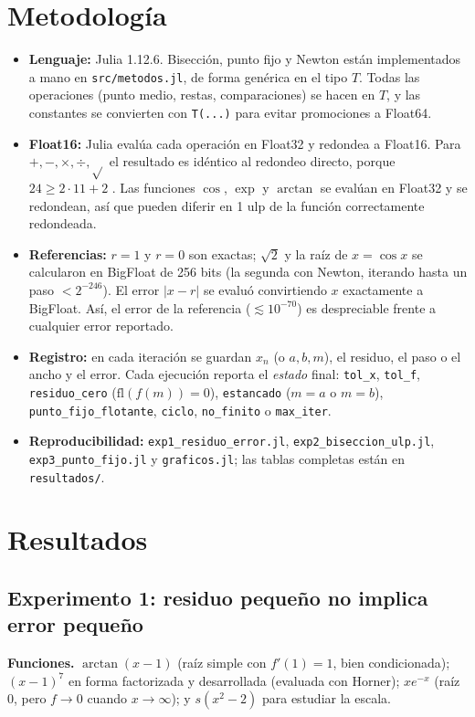\documentclass[11pt]{article}
\begin{document}
\section{Metodología}
\begin{itemize}
\item \textbf{Lenguaje:} Julia 1.12.6. Bisección, punto fijo y Newton están implementados a mano en \texttt{src/metodos.jl}, de forma genérica en el tipo $T$. Todas las operaciones (punto medio, restas, comparaciones) se hacen en $T$, y las constantes se convierten con \texttt{T(...)} para evitar promociones a Float64.
\item \textbf{Float16:} Julia evalúa cada operación en Float32 y redondea a Float16. Para $+,-,\times,\div,\sqrt{}$ el resultado es idéntico al redondeo directo, porque $24\ge 2\cdot11+2$ \cite{figueroa}. Las funciones $\cos$, $\exp$ y $\arctan$ se evalúan en Float32 y se redondean, así que pueden diferir en 1 ulp de la función correctamente redondeada.
\item \textbf{Referencias:} $r=1$ y $r=0$ son exactas; $\sqrt2$ y la raíz de $x=\cos x$ se calcularon en BigFloat de 256 bits (la segunda con Newton, iterando hasta un paso $<2^{-246}$). El error $|x-r|$ se evaluó convirtiendo $x$ exactamente a BigFloat. Así, el error de la referencia ($\lesssim10^{-70}$) es despreciable frente a cualquier error reportado.
\item \textbf{Registro:} en cada iteración se guardan $x_n$ (o $a,b,m$), el residuo, el paso o el ancho y el error. Cada ejecución reporta el \emph{estado} final: \texttt{tol\_x}, \texttt{tol\_f}, \texttt{residuo\_cero} ($\mathrm{fl}(f(m))=0$), \texttt{estancado} ($m=a$ o $m=b$), \texttt{punto\_fijo\_flotante}, \texttt{ciclo}, \texttt{no\_finito} o \texttt{max\_iter}.
\item \sloppy\textbf{Reproducibilidad:} \texttt{exp1\_residuo\_error.jl}, \texttt{exp2\_biseccion\_ulp.jl}, \texttt{exp3\_punto\_fijo.jl} y \texttt{graficos.jl}; las tablas completas están en \texttt{resultados/}.
\end{itemize}

\section{Resultados}

\subsection{Experimento 1: residuo pequeño no implica error pequeño}
\textbf{Funciones.} $\arctan(x-1)$ (raíz simple con $f'(1)=1$, bien condicionada); $(x-1)^7$ en forma factorizada y desarrollada (evaluada con Horner); $x e^{-x}$ (raíz $0$, pero $f\to0$ cuando $x\to\infty$); y $s(x^2-2)$ para estudiar la escala.
\end{document}
